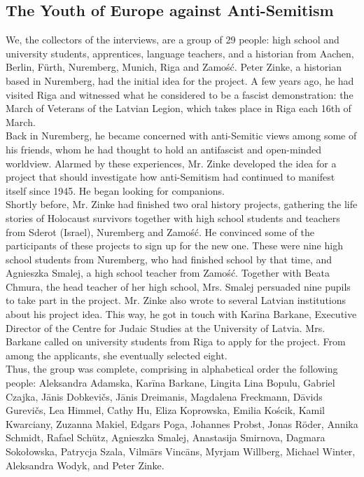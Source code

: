 \subsection*{The Youth of Europe against Anti-Semitism} 
We, the collectors of the interviews, are a group of 29 people: high school and university students, apprentices, language teachers, and a historian from Aachen, Berlin, Fürth, Nuremberg, Munich, Riga and Zamość. Peter Zinke, a historian based in Nuremberg, had the initial idea for the project. A few years ago, he had visited Riga and witnessed what he considered to be a fascist demonstration: the March of Veterans of the Latvian Legion, which takes place in Riga each 16th of March. \\
Back in Nuremberg, he became concerned with anti-Semitic views among some of his friends, whom he had thought to hold an antifascist and open-minded worldview. Alarmed by these experiences, Mr. Zinke developed the idea for a project that should investigate how anti-Semitism had continued to manifest itself since 1945. He began looking for companions. \\
Shortly before, Mr. Zinke had finished two oral history projects, gathering the life stories of Holocaust survivors together with high school students and teachers from Sderot (Israel), Nuremberg and Zamość. He convinced some of the participants of these projects to sign up for the new one. These were nine high school students from Nuremberg, who had finished school by that time, and Agnieszka Smalej, a high school teacher from Zamość. Together with Beata Chmura, the head teacher of her high school, Mrs. Smalej persuaded nine pupils to take part in the project. Mr. Zinke also wrote to several Latvian institutions about his project idea. This way, he got in touch with Karīna Barkane, Executive Director of the Centre for Judaic Studies at the University of Latvia. Mrs. Barkane called on university students from Riga to apply for the project. From among the applicants, she eventually selected eight.\\
Thus, the group was complete, comprising in alphabetical order the following people: Aleksandra Adamska, Karīna Barkane, Lingita Lina Bopulu, Gabriel Czajka, Jānis Dobkevičs, Jānis Dreimanis, Magdalena Freckmann, Dāvids Gurevičs, Lea Himmel, Cathy Hu, Eliza Koprowska, Emilia Kościk, Kamil Kwarciany, Zuzanna Makiel, Edgars Poga, Johannes Probst, Jonas Röder, Annika Schmidt, Rafael Schütz, Agnieszka Smalej, Anastasija Smirnova, Dagmara Sokołowska, Patrycja Szala, Vilmārs Vincāns, Myrjam Willberg, Michael Winter, Aleksandra Wodyk, and Peter Zinke. \\
